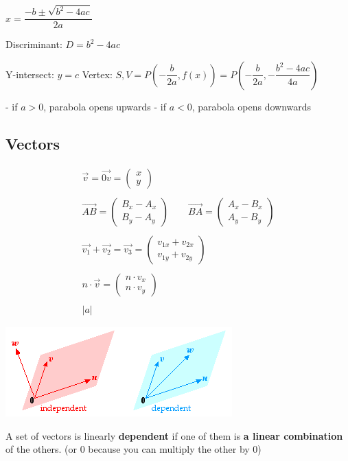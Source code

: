 $x = \dfrac{-b\pm\sqrt{b^2-4ac}}{2a}$

Discriminant: $D = b^2-4ac$

Y-intersect: $y = c$
Vertex: $S, V = P\left(-\dfrac{b}{2a}, f(x)\right) = P\left(-\dfrac{b}{2a}, -\dfrac{b^2-4ac}{4a}\right)$

- if $a > 0$, parabola opens upwards
- if $a < 0$, parabola opens downwards

\subsection{Vectors}

\newcommand\vecTwo[2]{\begin{pmatrix} #1 \\ #2 \end{pmatrix}}
\newcommand\vecThree[3]{\begin{pmatrix} #1 \\ #2 \\ #3 \end{pmatrix}}
\newcommand\abs[1]{\lvert #1 \rvert}

\begin{gather*}
\vec{v} = \vec{0v} = \vecTwo{x}{y} \\\\
\vec{AB} = \vecTwo{B_x - A_x}{B_y - A_y} \qquad \vec{BA} = \vecTwo{A_x - B_x}{A_y - B_y}\\\\
\vec{v_1} + \vec{v_2} = \vec{v_3} = \begin{pmatrix} v_{1x} + v_{2x} \\ v_{1y} + v_{2y} \end{pmatrix} \\\\
n\cdot\vec{v}=\vecTwo{n\cdot v_x}{n\cdot v_y} \\\\
\abs{a}
\end{gather*}

\includegraphics{./mathematics/imgs/linear.png}

A set of vectors is linearly \textbf{dependent} if one of them is \textbf{a linear combination} of the others. (or 0 because you can multiply the other by 0)
